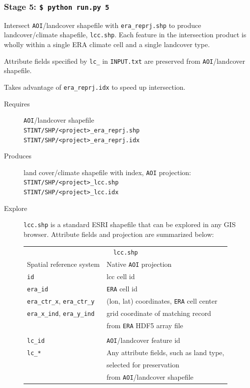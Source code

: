 \documentclass[twoside,a4paper]{refart}
\begin{document}
\subsubsection{\textbf{Stage 5:} \texttt{\$ python run.py 5}}
Intersect \texttt{AOI}/landcover shapefile with \texttt{era\_reprj.shp} to produce landcover/climate shapefile, \texttt{lcc.shp}.  Each feature in the intersection product is wholly within a single ERA climate cell and a single landcover type.
          
Attribute fields specified by \texttt{lc\_} in \texttt{INPUT.txt} are preserved from \texttt{AOI}/landcover shapefile.
          
Takes advantage of \texttt{era\_reprj.idx} to speed up intersection.

  \begin{description}
    \item [Requires]
      \texttt{AOI}/landcover shapefile\\
      \texttt{STINT/SHP/<project>\_era\_reprj.shp}\\
      \texttt{STINT/SHP/<project>\_era\_reprj.idx}  
  
  
    \item [Produces]
      land cover/climate shapefile with index, 
      \texttt{AOI} projection:\\
      \texttt{STINT/SHP/<project>\_lcc.shp}\\
      \texttt{STINT/SHP/<project>\_lcc.idx}

    \item [Explore]
      \texttt{lcc.shp} is a standard ESRI shapefile that can be explored in any GIS browser.  Attribute fields and projection are summarized below:
      
\begin{tabular}{ll}
       \multicolumn{2}{c}{\texttt{lcc.shp}} \\
Spatial reference system        & Native \texttt{AOI} projection \\
\texttt{id}                     & lcc cell id \\  
\texttt{era\_id}                & \texttt{ERA} cell id \\  
\texttt{era\_ctr\_x}, \texttt{era\_ctr\_y} & (lon, lat) coordinates, \texttt{ERA} cell center \\
\texttt{era\_x\_ind}, \texttt{era\_y\_ind} & grid coordinate of matching record \\
                                          & from \texttt{ERA} HDF5 array file\\
\\
\texttt{lc\_id}                & \texttt{AOI}/landcover feature id \\
\texttt{lc\_*}                & Any attribute fields, such as land type, \\
                             & selected for preservation \\
                             & from \texttt{AOI}/landcover shapefile \\

\end{tabular}
  \end{description}
\end{document}
